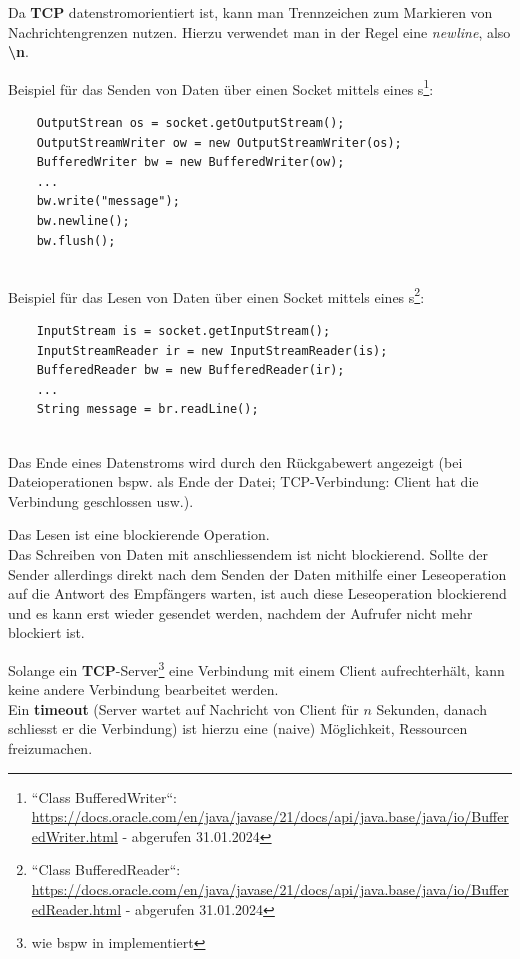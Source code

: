 \noindent
Da \textbf{TCP} datenstromorientiert ist, kann man Trennzeichen zum Markieren von Nachrichtengrenzen nutzen.
Hierzu verwendet man in der Regel eine \textit{newline}, also \textbf{\textbackslash n}.

Beispiel für das Senden von Daten über einen Socket mittels eines s\footnote{
    ``Class BufferedWriter``: \url{https://docs.oracle.com/en/java/javase/21/docs/api/java.base/java/io/BufferedWriter.html} - abgerufen 31.01.2024
}:
\begin{verbatim}
    OutputStrean os = socket.getOutputStream();
    OutputStreamWriter ow = new OutputStreamWriter(os);
    BufferedWriter bw = new BufferedWriter(ow);
    ...
    bw.write("message");
    bw.newline();
    bw.flush();
\end{verbatim}\\

Beispiel für das Lesen von Daten über einen Socket mittels eines s\footnote{
    ``Class BufferedReader``: \url{https://docs.oracle.com/en/java/javase/21/docs/api/java.base/java/io/BufferedReader.html} - abgerufen 31.01.2024
}:
\begin{verbatim}
    InputStream is = socket.getInputStream();
    InputStreamReader ir = new InputStreamReader(is);
    BufferedReader bw = new BufferedReader(ir);
    ...
    String message = br.readLine();
\end{verbatim}\\

\noindent
Das Ende eines Datenstroms wird durch den Rückgabewert  angezeigt (bei Dateioperationen {bspw.} als Ende der Datei; TCP-Verbindung: Client hat die Verbindung geschlossen usw.).

\begin{tcolorbox}[enlarge top by=0.5cm,enlarge bottom by=0.5cm]
    Das Lesen ist eine blockierende Operation.\\
    Das Schreiben von Daten mit anschliessendem  ist nicht blockierend.
    Sollte der Sender allerdings direkt nach dem Senden der Daten mithilfe einer Leseoperation auf die Antwort des Empfängers warten, ist auch diese Leseoperation blockierend und es kann erst wieder gesendet werden, nachdem der Aufrufer nicht mehr blockiert ist.
\end{tcolorbox}

\noindent
Solange ein \textbf{TCP}-Server\footnote{
 wie bspw in \cite[288, Listing 5.8]{Oec22} implementiert
} eine Verbindung mit einem Client aufrechterhält, kann keine andere Verbindung bearbeitet werden.\\
Ein \textbf{timeout} (Server wartet auf Nachricht von Client für $n$ Sekunden, danach schliesst er die Verbindung) ist hierzu eine (naive) Möglichkeit, Ressourcen freizumachen.

